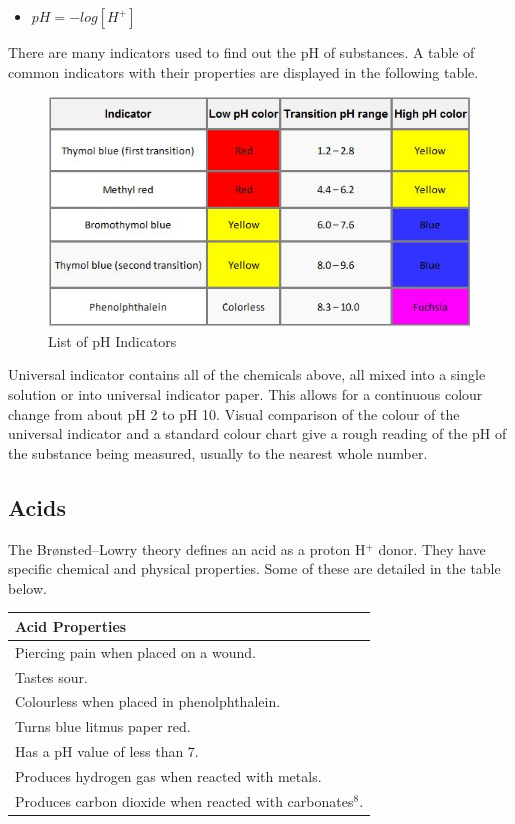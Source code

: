 \begin{itemize}
\item $pH = - log [H^+]$
\end{itemize}

There are many indicators used to find out the pH of substances. A table of common indicators with their properties are displayed in the following table.

\begin{figure}[H]
    \includegraphics[width=\textwidth]{./Planning/Images/Indicators.jpg}
    \caption{List of pH Indicators} \label{fig:pH Indicators}
\end{figure}

Universal indicator contains all of the chemicals above, all mixed into a single solution or into universal indicator paper. This allows for a continuous colour change from about pH 2 to pH 10. Visual comparison of the colour of the universal indicator and a standard colour chart give a rough reading of the pH of the substance being measured, usually to the nearest whole number. 


	\subsection{Acids}

The Brønsted–Lowry theory defines an acid as a proton H$^+$ donor. They have specific chemical and physical properties. Some of these are detailed in the table below.

\begin{center}
\begin{tabular}{|l|}
    \hline
    \textbf{Acid Properties}  \\ \hline
Piercing pain when placed on a wound. \\ \hline
Tastes sour. \\ \hline
Colourless when placed in phenolphthalein. \\ \hline
Turns blue litmus paper red. \\ \hline
Has a pH value of less than 7. \\ \hline
Produces hydrogen gas when reacted with metals. \\ \hline
Produces carbon dioxide when reacted with carbonates$^8$. \\ \hline
\end{tabular}

\label{tab:Acid Properties}
\end{center}

